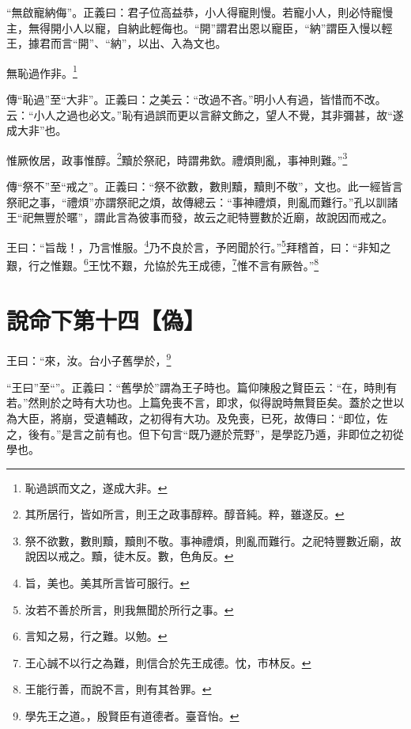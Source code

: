 {\noindent\shu{}\fzkt “無啟寵納侮”。正義曰：君子位高益恭，小人得寵則慢。若寵小人，則必恃寵慢主，無得開小人以寵，自納此輕侮也。“開”謂君出恩以寵臣，“納”謂臣入慢以輕王，據君而言“開”、“納”，以出、入為文也。 \par}

無恥過作非。\footnote{恥過誤而文之，遂成大非。}

{\noindent\zhuan{}\fzbyks 傳“恥過”至“大非”。正義曰：之美云：“改過不吝。”明小人有過，皆惜而不改。云：“小人之過也必文。”恥有過誤而更以言辭文飾之，望人不覺，其非彌甚，故“遂成大非”也。 \par}

惟厥攸居，政事惟醇。\footnote{其所居行，皆如所言，則王之政事醇粹。醇音純。粹，雖遂反。}黷於祭祀，時謂弗欽。禮煩則亂，事神則難。”\footnote{祭不欲數，數則黷，黷則不敬。事神禮煩，則亂而難行。之祀特豐數近廟，故說因以戒之。黷，徒木反。數，色角反。}

{\noindent\zhuan{}\fzbyks 傳“祭不”至“戒之”。正義曰：“祭不欲數，數則黷，黷則不敬”，文也。此一經皆言祭祀之事，“禮煩”亦謂祭祀之煩，故傳總云：“事神禮煩，則亂而難行。”孔以訓諸王“祀無豐於暱”，謂此言為彼事而發，故云之祀特豐數於近廟，故說因而戒之。 \par}

王曰：“旨哉！，乃言惟服。\footnote{旨，美也。美其所言皆可服行。}乃不良於言，予罔聞於行。”\footnote{汝若不善於所言，則我無聞於所行之事。}拜稽首，曰：“非知之艱，行之惟艱。\footnote{言知之易，行之難。以勉。}王忱不艱，允協於先王成德，\footnote{王心誠不以行之為難，則信合於先王成德。忱，市林反。}惟不言有厥咎。”\footnote{王能行善，而說不言，則有其咎罪。}

\section{說命下第十四【偽】}

王曰：“來，汝。台小子舊學於，\footnote{學先王之道。，殷賢臣有道德者。臺音怡。}

{\noindent\shu{}\fzkt “王曰”至“”。正義曰：“舊學於”謂為王子時也。篇仰陳殷之賢臣云：“在，時則有若。”然則於之時有大功也。上篇免喪不言，即求，似得說時無賢臣矣。蓋於之世以為大臣，將崩，受遺輔政，之初得有大功。及免喪，已死，故傳曰：“即位，佐之，後有。”是言之前有也。但下句言“既乃遯於荒野”，是學訖乃遁，非即位之初從學也。 \par}

